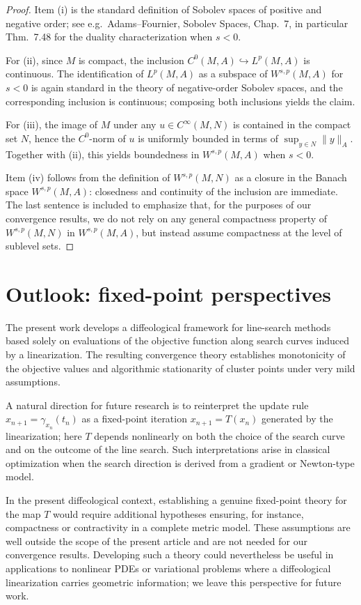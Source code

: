 \documentclass{amsart}
\newcounter{thm}
\newcounter{ex}
\newcounter{re}
\begin{document}
{\begin{proof}
Item (i) is the standard definition of Sobolev spaces of positive and negative
order; see e.g.\ Adams--Fournier, Sobolev Spaces, Chap.~7, in particular Thm.~7.48
for the duality characterization when $s<0$.

For (ii), since $M$ is compact, the inclusion $C^0(M,A)\hookrightarrow L^p(M,A)$
is continuous. The identification of $L^p(M,A)$ as a subspace of $W^{s,p}(M,A)$
for $s<0$ is again standard in the theory of negative-order Sobolev spaces,
and the corresponding inclusion is continuous; composing both inclusions yields
the claim.

For (iii), the image of $M$ under any $u\in C^\infty(M,N)$ is contained in the
compact set $N$, hence the $C^0$-norm of $u$ is uniformly bounded in terms of
$\sup_{y\in N}\|y\|_A$. Together with (ii), this yields boundedness in
$W^{s,p}(M,A)$ when $s<0$.

Item (iv) follows from the definition of $W^{s,p}(M,N)$ as a closure in the
Banach space $W^{s,p}(M,A)$: closedness and continuity of the inclusion are
immediate. The last sentence is included to emphasize that, for the purposes
of our convergence results, we do not rely on any general compactness property
of $W^{s,p}(M,N)$ in $W^{s,p}(M,A)$, but instead assume compactness at the level
of sublevel sets.
\end{proof} }
\section{Outlook: fixed-point perspectives}\label{sec:outlook}

{\color{black} The present work develops a diffeological framework for line-search
methods based solely on evaluations of the objective function along
search curves induced by a linearization.
The resulting convergence theory establishes monotonicity of the
objective values and algorithmic stationarity of cluster points under
very mild assumptions.

A natural direction for future research is to reinterpret the update
rule $x_{n+1}=\gamma_{x_n}(t_n)$ as a fixed-point iteration
$x_{n+1}=T(x_n)$ generated by the linearization; here $T$ depends
nonlinearly on both the choice of the search curve and on the outcome
of the line search.
Such interpretations arise in classical optimization when the
search direction is derived from a gradient or Newton-type model.

In the present diffeological context, establishing a genuine fixed-point
theory for the map $T$ would require additional hypotheses ensuring,
for instance, compactness or contractivity in a complete metric model.
These assumptions are well outside the scope of the present article
and are not needed for our convergence results.
Developing such a theory could nevertheless be useful in applications
to nonlinear PDEs or variational problems where a diffeological
linearization carries geometric information; we leave this perspective
for future work.}
\end{document}

